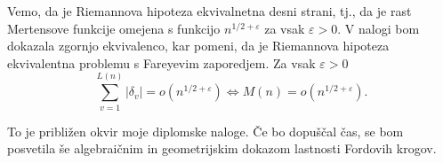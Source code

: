 \documentclass[a4paper,9pt]{article}
\begin{document}
Vemo, da je Riemannova hipoteza ekvivalnetna desni strani, tj., da je rast Mertensove funkcije omejena s funkcijo $n^{1/2+\varepsilon}$ za vsak $\varepsilon > 0$. V nalogi bom dokazala zgornjo ekvivalenco, kar pomeni, da je Riemannova hipoteza ekvivalentna problemu s Fareyevim zaporedjem.
Za vsak $\varepsilon > 0$ 
\[ \sum_{v=1}^{L(n)}|\delta_{v}| = o(n^{1/2+\varepsilon}) \iff M(n) = o(n^{1/2+\varepsilon}). \]

To je približen okvir moje diplomske naloge. Če bo dopuščal čas, se bom posvetila še algebraičnim in geometrijskim dokazom lastnosti Fordovih krogov.
\end{document}

